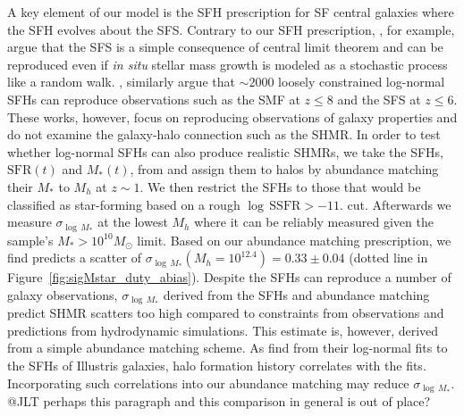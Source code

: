 \documentclass[12pt, letterpaper, preprint, tighten]{aastex62}
\newcommand{\ch}[1]{\color{orange}{\bf CH:} #1}
\begin{document}
A key element of our model is the SFH prescription for SF central galaxies where 
the SFH evolves about the SFS. Contrary to our SFH prescription, \cite{kelson2014}, 
for example, argue that the SFS is a simple consequence of central limit theorem 
and can be reproduced even if \emph{in situ} stellar mass growth is modeled as 
a stochastic process like a random walk. \cite{gladders2013,abramson2015,abramson2016}, 
similarly argue that $\sim2000$ loosely constrained log-normal SFHs can reproduce 
observations such as the SMF at $z \leq 8$ and the SFS at $z \leq 6$. These works, 
however, focus on reproducing observations of galaxy properties and do not examine
the galaxy-halo connection such as the SHMR. In order to test whether log-normal 
SFHs can also produce realistic SHMRs, we take the SFHs, $\mathrm{SFR}(t)$ and 
$M_*(t)$, from \cite{abramson2016} and assign them to halos by abundance matching 
their $M_*$ to $M_h$ at $z{\sim}1$. We then restrict the SFHs to those that would 
be classified as star-forming based on a rough $\log\,\mathrm{SSFR} > -11.$ cut.
Afterwards we measure $\sigma_{\log\,M_*}$ at the lowest $M_h$ where it can be 
reliably measured given the \cite{abramson2016} sample's $M_*{>}10^{10}M_\odot$ 
limit. Based on our abundance matching prescription, we find \cite{abramson2016}
predicts a scatter of $\sigma_{\log\,M_*}(M_h=10^{12.4}) = 0.33\pm0.04$ (dotted 
line in Figure~\ref{fig:sigMstar_duty_abias}). Despite the \cite{abramson2016} SFHs 
can reproduce a number of galaxy observations, $\sigma_{\log\,M_*}$ derived from 
the SFHs and abundance matching predict SHMR scatters too high compared to 
constraints from observations and predictions from hydrodynamic simulations. 
This estimate is, however, derived from a simple abundance matching scheme. 
As \cite{diemer2017} find from their log-normal fits to the SFHs of Illustris 
galaxies, halo formation history correlates with the fits. Incorporating such 
correlations into our abundance matching may reduce $\sigma_{\log\,M_*}$. 
{\ch @JLT perhaps this paragraph and this comparison in general is out of place?} 
\end{document}
